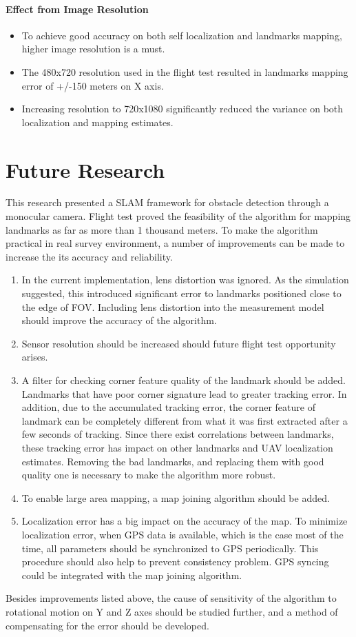 \paragraph{Effect from Image Resolution}
\begin{itemize}
  \item To achieve good accuracy on both self localization and landmarks
  mapping, higher image resolution is a must.
  \item The 480x720 resolution used in the flight test resulted in
  landmarks mapping error of +/-150 meters on X axis.
  \item Increasing resolution to 720x1080 significantly reduced the
  variance on both localization and mapping estimates.
\end{itemize}

\section{Future Research}
This research presented a SLAM framework for obstacle detection
through a monocular camera. Flight test proved the feasibility of the
algorithm for mapping landmarks as far as more than 1 thousand meters.
To make the algorithm practical in real survey environment, a number
of improvements can be made to increase the its accuracy and reliability.
\begin{enumerate}
  \item In the current implementation, lens distortion was ignored. As
  the simulation suggested, this introduced significant error to
  landmarks positioned close to the edge of FOV. Including lens
  distortion into the measurement model should improve the accuracy of
  the algorithm.
  \item Sensor resolution should be increased should future flight
  test opportunity arises.
  \item A filter for checking corner feature quality of the landmark
  should be added. Landmarks that have poor corner signature lead to
  greater tracking error. In addition, due to the accumulated tracking
  error, the corner feature of landmark can be completely different
  from what it was first extracted after a few seconds of tracking.
  Since there exist correlations between landmarks, these tracking
  error has impact on other landmarks and UAV localization estimates.
  Removing the bad landmarks, and replacing them with good quality one is
  necessary to make the algorithm more robust.
  \item To enable large area mapping, a map joining algorithm should
  be added.
  \item Localization error has a big impact on the accuracy of the
  map. To minimize localization error, when GPS data is available,
  which is the case most of the time, all parameters should be
  synchronized to GPS periodically. This procedure should also help to
  prevent consistency problem. GPS syncing could be integrated with
  the map joining algorithm.
\end{enumerate}

Besides improvements listed above, the cause of sensitivity of the
algorithm to rotational motion on Y and Z axes should be studied
further, and a method of compensating for the error should be
developed.

